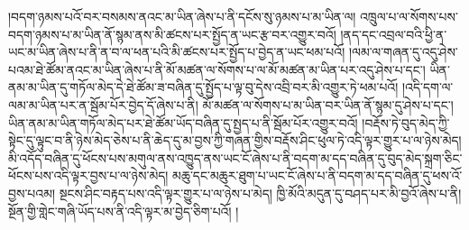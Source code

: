།བདག་ཉམས་པའོ་བར་བསམས་ནའང་མ་ཡིན་ཞེས་པ་ནི་དངོས་སུ་ཉམས་པ་མ་ཡིན་ལ། འཁྲུལ་པ་ལ་སོགས་པས་བདག་ཉམས་པ་མ་ཡིན་ནོ་སྙམ་ནས་མི་ཚངས་པར་སྤྱོད་ན་ཡང་རྩ་བར་འགྱུར་བའོ། །ནད་དང་འབྲལ་བའི་ཕྱི་ན་ཡང་མ་ཡིན་ཞེས་པ་ནི་ན་བ་ལ་ཕན་པའི་མི་ཚངས་པར་སྤྱོད་པ་བྱེད་ན་ཡང་ཕམ་པའོ། །ལམ་ལ་གཞན་དུ་འདུ་ཤེས་པའམ་ཐེ་ཚོམ་ནའང་མ་ཡིན་ཞེས་པ་ནི་མོ་མཚན་ལ་སོགས་པ་ལ་མོ་མཚན་མ་ཡིན་པར་འདུ་ཤེས་པ་དང་། ཡིན་ནམ་མ་ཡིན་དུ་གཏོལ་མེད་དེ་ཐེ་ཚོམ་ཟ་བཞིན་དུ་སྤྱོད་པ་ལྟ་བུ་དེས་འབྲི་བར་མི་འགྱུར་ཏེ་ཕམ་པའོ། །འདི་དག་ལ་ལམ་མ་ཡིན་པར་ན་སྦོམ་པོར་བྱེད་དོ་ཞེས་པ་ནི། མོ་མཚན་ལ་སོགས་པ་མ་ཡིན་བར་ཡིན་ནོ་སྙམ་དུ་ཤེས་པ་དང་། ཡིན་ནམ་མ་ཡིན་གཏོལ་མེད་པར་ཐེ་ཚོམ་ཡོད་བཞིན་དུ་སྤྱད་པ་ནི་སྦོམ་པོར་འགྱུར་བའོ། །བརྡོས་ཏེ་བུད་མེད་ཀྱི་སྟེང་དུ་ལྟུང་བ་ནི་ཉེས་མེད་ཅེས་པ་ནི་ཆེད་དུ་མ་བྱས་ཀྱི་གཞན་གྱིས་བརྡོས་ཤིང་ཕུལ་ཏེ་འདི་ལྟར་གྱུར་པ་ལ་ཉེས་མེད། མི་འདོད་བཞིན་དུ་ཕོངས་པས་མགུལ་ནས་འཁྱུད་ནས་ཡང་ངོ་ཞེས་པ་ནི་བདག་མ་དད་བཞིན་དུ་བུད་མེད་སྐྲག་ཅིང་ཕོངས་པས་འདི་ལྟར་བྱས་པ་ལ་ཉེས་མེད། མཆུ་དང་མཆུར་ཐུག་པ་ཡང་ངོ་ཞེས་པ་ནི་བདག་མ་དད་བཞིན་དུ་ཕས་འོ་བྱས་པའམ། སྔངས་ཤིང་བརྟད་པས་འདི་ལྟར་གྱུར་པ་ལ་ཉེས་པ་མེད། ཁྱི་མོའི་མདུན་དུ་བཤད་པར་མི་བྱའོ་ཞེས་པ་ནི། སྔོན་གྱི་གླེང་གཞི་ཡོད་པས་ནི་འདི་ལྟར་མ་བྱེད་ཅིག་པའོ། །
